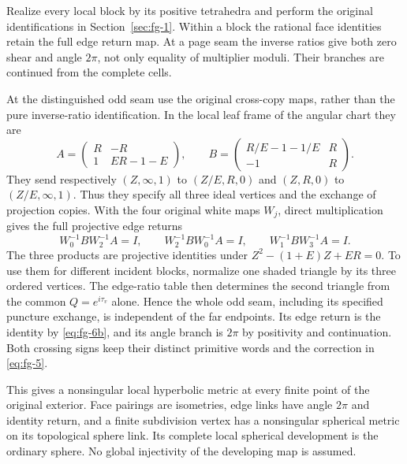 Realize every local block by its positive tetrahedra and perform the original identifications in Section~\ref{sec:fg-1}. Within a block the rational face identities retain the full edge return map. At a page seam the inverse ratios give both zero shear and angle \(2\pi\), not only equality of multiplier moduli. Their branches are continued from the complete cells.

At the distinguished odd seam use the original cross-copy maps, rather than the pure inverse-ratio identification. In the local leaf frame of the angular chart they are
\begin{equation}
A=\begin{pmatrix}R&-R\\1&ER-1-E\end{pmatrix},\qquad
 B=\begin{pmatrix}R/E-1-1/E&R\\-1&R\end{pmatrix}.
\label{eq:fg-6a}
\end{equation}
They send respectively \((Z,\infty,1)\) to \((Z/E,R,0)\) and \((Z,R,0)\) to \((Z/E,\infty,1)\). Thus they specify all three ideal vertices and the exchange of projection copies. With the four original white maps \(W_j\), direct multiplication gives the full projective edge returns
\begin{equation}
W_0^{-1}BW_2^{-1}A=I,\qquad
 W_2^{-1}BW_0^{-1}A=I,\qquad
 W_1^{-1}BW_3^{-1}A=I.
\label{eq:fg-6b}
\end{equation}
The three products are projective identities under
\(Z^2-(1+E)Z+ER=0\). To use them for different incident blocks,
normalize one shaded triangle by its three ordered vertices. The
edge-ratio table then determines the second triangle from the common
\(Q=e^{i\tau_v}\) alone. Hence the whole odd seam, including its
specified puncture exchange, is independent of the far endpoints.
Its edge return is the identity by \eqref{eq:fg-6b}, and its angle
branch is \(2\pi\) by positivity and continuation. Both crossing signs
keep their distinct primitive words and the correction in
\eqref{eq:fg-5}.

This gives a nonsingular local hyperbolic metric at every finite point of the original exterior. Face pairings are isometries, edge links have angle \(2\pi\) and identity return, and a finite subdivision vertex has a nonsingular spherical metric on its topological sphere link. Its complete local spherical development is the ordinary sphere. No global injectivity of the developing map is assumed.


